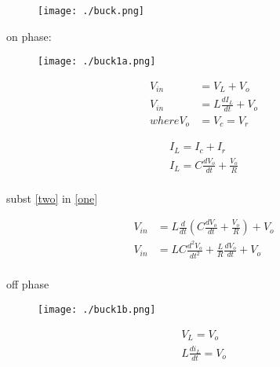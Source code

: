 \documentclass{article}
\begin{document}
\begin{figure}[h]
\texttt{[image: ./buck.png]}
\end{figure}

\newpage

on phase:

\begin{figure}[h]
\texttt{[image: ./buck1a.png]}
\end{figure}

\begin{equation} \label{one}
\begin{split}
V_{in} & = V_L + V_o \\
V_{in} & = L\frac{dI_L}{dt} + V_o \\
where V_o & = V_c = V_r
\end{split}
\end{equation}

\begin{equation} \label{two}
\begin{split}
I_L = I_c + I_r \\
I_L = C \frac{dV_o}{dt} + \frac{V_o}{R} \\
\end{split}
\end{equation}

\filbreak
subst \ref{two} in \ref{one}

\begin{equation} \label{three}
\begin{split}
V_{in} & = L \frac{d}{dt} ( C \frac{dV_o}{dt} + \frac{V_o}{R} ) + V_o \\
V_{in} & =  L C \frac{d^2 V_o}{dt^2} + \frac{L}{R} \frac{d V_o}{dt} + V_o \\
\end{split}
\end{equation}


\newpage

off phase

\begin{figure}[h]
\texttt{[image: ./buck1b.png]}
\end{figure}

\begin{equation} \label{one_off}
\begin{split}
V_L = V_o \\
L\frac{di_L}{dt} = V_o \\
\end{split}
\end{equation}
\end{document}
